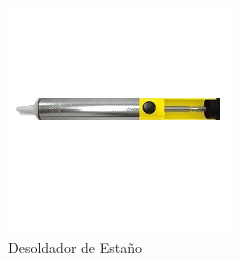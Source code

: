 \begin{figure}[h]
	\centering
	\includegraphics[width=0.5\linewidth]{herramientas/desoldador}
	\caption{Desoldador de Estaño}
	\label{fig:desoldador}
\end{figure}

